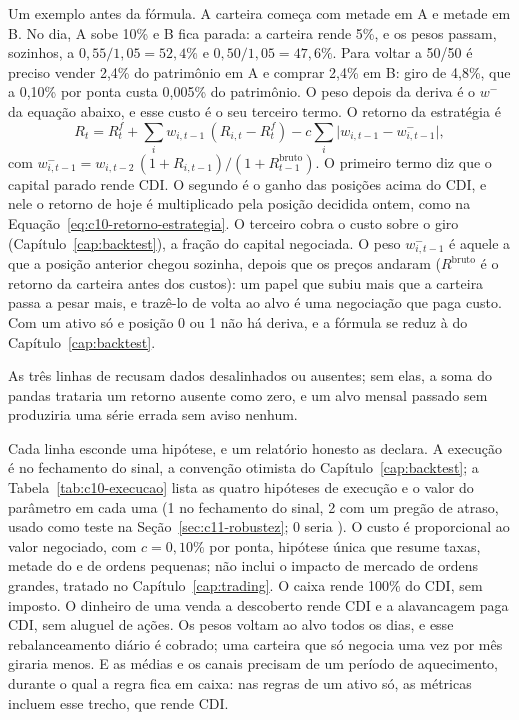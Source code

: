 Um exemplo antes da fórmula. A carteira começa com metade em A e metade em B. No dia, A sobe 10\% e B fica parada: a carteira rende 5\%, e os pesos passam, sozinhos, a $0,55/1,05 = 52,4\%$ e $0,50/1,05 = 47,6\%$. Para voltar a 50/50 é preciso vender 2,4\% do patrimônio em A e comprar 2,4\% em B: giro de 4,8\%, que a 0,10\% por ponta custa 0,005\% do patrimônio. O peso depois da deriva é o $w^{-}$ da equação abaixo, e esse custo é o seu terceiro termo. O retorno da estratégia é
\begin{equation}
  R_t = R^f_t + \sum_i w_{i,t-1}\,(R_{i,t} - R^f_t) - c \sum_i \bigl| w_{i,t-1} - w^{-}_{i,t-1} \bigr| ,
  \label{eq:c11-motor}
\end{equation}
com $w^{-}_{i,t-1} = w_{i,t-2}\,(1 + R_{i,t-1}) / (1 + R^{\text{bruto}}_{t-1})$.
O primeiro termo diz que o capital parado rende CDI. O segundo é o ganho das posições acima do CDI, e nele o retorno de hoje é multiplicado pela posição decidida ontem, como na Equação~\eqref{eq:c10-retorno-estrategia}. O terceiro cobra o custo sobre o giro (Capítulo~\ref{cap:backtest}), a fração do capital negociada. O peso $w^{-}_{i,t-1}$ é aquele a que a posição anterior chegou sozinha, depois que os preços andaram ($R^{\text{bruto}}$ é o retorno da carteira antes dos custos): um papel que subiu mais que a carteira passa a pesar mais, e trazê-lo de volta ao alvo é uma negociação que paga custo. Com um ativo só e posição 0 ou 1 não há deriva, e a fórmula se reduz à do Capítulo~\ref{cap:backtest}.



As três linhas de  recusam dados desalinhados ou ausentes; sem elas, a soma do pandas trataria um retorno ausente como zero, e um alvo mensal passado sem  produziria uma série errada sem aviso nenhum.

Cada linha esconde uma hipótese, e um relatório honesto as declara. A execução é no fechamento do sinal, a convenção otimista do Capítulo~\ref{cap:backtest}; a Tabela~\ref{tab:c10-execucao} lista as quatro hipóteses de execução e o valor do parâmetro  em cada uma (1 no fechamento do sinal, 2 com um pregão de atraso, usado como teste na Seção~\ref{sec:c11-robustez}; 0 seria ). O custo é proporcional ao valor negociado, com $c = 0,10\%$ por ponta, hipótese única que resume taxas, metade do  e  de ordens pequenas; não inclui o impacto de mercado de ordens grandes, tratado no Capítulo~\ref{cap:trading}. O caixa rende 100\% do CDI, sem imposto. O dinheiro de uma venda a descoberto rende CDI e a alavancagem paga CDI, sem aluguel de ações. Os pesos voltam ao alvo todos os dias, e esse rebalanceamento diário é cobrado; uma carteira que só negocia uma vez por mês giraria menos. E as médias e os canais precisam de um período de aquecimento, durante o qual a regra fica em caixa: nas regras de um ativo só, as métricas incluem esse trecho, que rende CDI.

